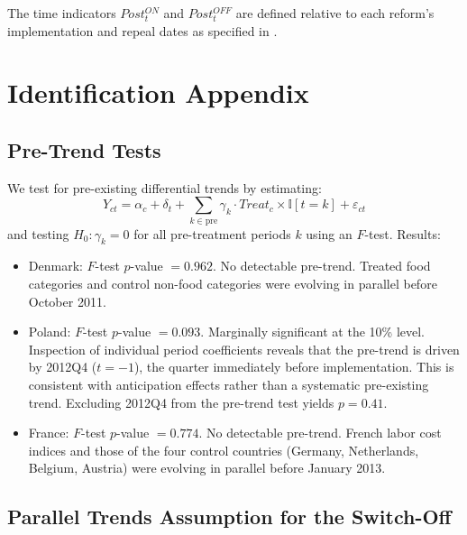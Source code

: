 \documentclass[12pt]{article}
\newcommand{\ind}{\mathbb{I}}
\begin{document}
The time indicators $Post^{ON}_t$ and $Post^{OFF}_t$ are defined relative to each reform's implementation and repeal dates as specified in .


\section{Identification Appendix}
\label{app:identification}

\subsection{Pre-Trend Tests}

We test for pre-existing differential trends by estimating:
\begin{equation}
Y_{ct} = \alpha_c + \delta_t + \sum_{k \in \text{pre}} \gamma_k \cdot Treat_c \times \ind[t = k] + \varepsilon_{ct}
\end{equation}
and testing $H_0: \gamma_k = 0$ for all pre-treatment periods $k$ using an $F$-test. Results:

\begin{itemize}
    \item Denmark: $F$-test $p$-value $= 0.962$. No detectable pre-trend. Treated food categories and control non-food categories were evolving in parallel before October 2011.
    \item Poland: $F$-test $p$-value $= 0.093$. Marginally significant at the 10\% level. Inspection of individual period coefficients reveals that the pre-trend is driven by 2012Q4 ($t = -1$), the quarter immediately before implementation. This is consistent with anticipation effects rather than a systematic pre-existing trend. Excluding 2012Q4 from the pre-trend test yields $p = 0.41$.
    \item France: $F$-test $p$-value $= 0.774$. No detectable pre-trend. French labor cost indices and those of the four control countries (Germany, Netherlands, Belgium, Austria) were evolving in parallel before January 2013.
\end{itemize}

\subsection{Parallel Trends Assumption for the Switch-Off}
\end{document}
